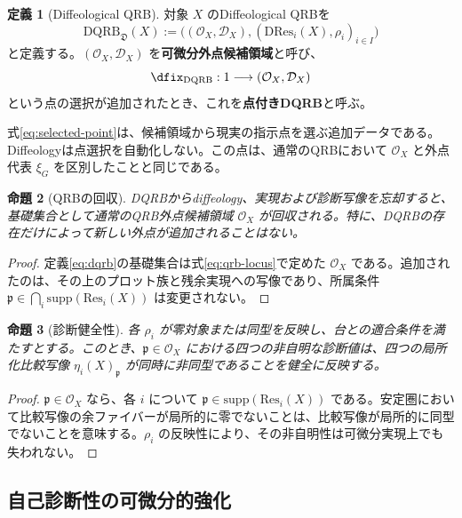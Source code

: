 \documentclass[a4paper,11pt]{ltjsarticle}
\theoremstyle{definition}
\newtheorem{definition}{定義}[section]
\theoremstyle{plain}
\newtheorem{proposition}[definition]{命題}
\newcommand{\DQRB}{\mathrm{DQRB}}
\newcommand{\Res}{\mathrm{Res}}
\newcommand{\DRes}{\mathrm{DRes}}
\newcommand{\supp}{\mathrm{supp}}
\begin{document}
\begin{definition}[Diffeological QRB]
対象 $X$ のDiffeological QRBを
\begin{equation}
 \DQRB_{\mathfrak D}(X)
 :=
 \bigl(
   (\mathcal O_X,\mathcal D_X),
   (\DRes_i(X),\rho_i)_{i\in I}
 \bigr)
 \label{eq:dqrb}
\end{equation}
と定義する。$(\mathcal O_X,\mathcal D_X)$ を\textbf{可微分外点候補領域}と呼び、
\begin{equation}
 \dfix_{\DQRB}:1\longrightarrow(\mathcal O_X,\mathcal D_X)
 \label{eq:selected-point}
\end{equation}
という点の選択が追加されたとき、これを\textbf{点付きDQRB}と呼ぶ。
\end{definition}

式\eqref{eq:selected-point}は、候補領域から現実の指示点を選ぶ追加データである。Diffeologyは点選択を自動化しない。この点は、通常のQRBにおいて $\mathcal O_X$ と外点代表 $\xi_G$ を区別したことと同じである。

\begin{proposition}[QRBの回収]
DQRBからdiffeology、実現および診断写像を忘却すると、基礎集合として通常のQRB外点候補領域 $\mathcal O_X$ が回収される。特に、DQRBの存在だけによって新しい外点が追加されることはない。
\end{proposition}

\begin{proof}
定義\eqref{eq:dqrb}の基礎集合は式\eqref{eq:qrb-locus}で定めた $\mathcal O_X$ である。追加されたのは、その上のプロット族と残余実現への写像であり、所属条件 $\mathfrak p\in\bigcap_i\supp(\Res_i(X))$ は変更されない。
\end{proof}

\begin{proposition}[診断健全性]
各 $\rho_i$ が零対象または同型を反映し、台との適合条件を満たすとする。このとき、$\mathfrak p\in\mathcal O_X$ における四つの非自明な診断値は、四つの局所化比較写像 $\eta_i(X)_{\mathfrak p}$ が同時に非同型であることを健全に反映する。
\end{proposition}

\begin{proof}
$\mathfrak p\in\mathcal O_X$ なら、各 $i$ について $\mathfrak p\in\supp(\Res_i(X))$ である。安定圏において比較写像の余ファイバーが局所的に零でないことは、比較写像が局所的に同型でないことを意味する。$\rho_i$ の反映性により、その非自明性は可微分実現上でも失われない。
\end{proof}

\subsection{自己診断性の可微分的強化}
\end{document}
